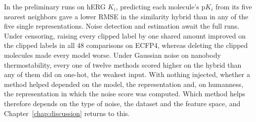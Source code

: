 In the preliminary runs on hERG $K_i$, predicting each molecule's p$K_i$ from its five nearest neighbors gave a lower RMSE in the similarity hybrid than in any of the five single representations. Noise detection and estimation await the full runs. Under censoring, raising every clipped label by one shared amount improved on the clipped labels in all 48 comparisons on ECFP4, whereas deleting the clipped molecules made every model worse. Under Gaussian noise on nanobody thermostability, every one of twelve methods scored higher on the hybrid than any of them did on one-hot, the weakest input. With nothing injected, whether a method helped depended on the model, the representation and, on humanness, the representation in which the noise score was computed. Which method helps therefore depends on the type of noise, the dataset and the feature space, and Chapter~\ref{chap:discussion} returns to this.


